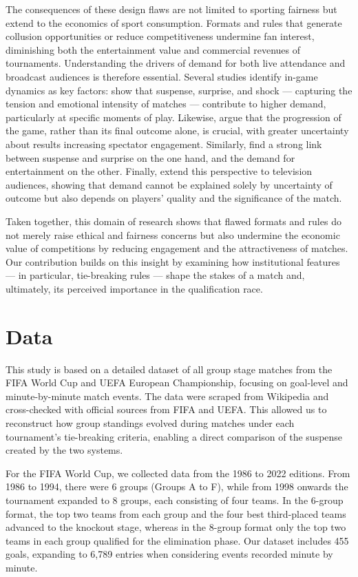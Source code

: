 \documentclass[11pt]{article}
\begin{document}
The consequences of these design flaws are not limited to sporting fairness but extend to the economics of sport consumption. Formats and rules that generate collusion opportunities or reduce competitiveness undermine fan interest, diminishing both the entertainment value and commercial revenues of tournaments. Understanding the drivers of demand for both live attendance and broadcast audiences is therefore essential. Several studies identify in-game dynamics as key factors: \citet{buraimo2020unscripted} show that suspense, surprise, and shock — capturing the tension and emotional intensity of matches — contribute to higher demand, particularly at specific moments of play. Likewise, \citet{alavy2010edge} argue that the progression of the game, rather than its final outcome alone, is crucial, with greater uncertainty about results increasing spectator engagement. Similarly, \citet{bizzozero2016importance} find a strong link between suspense and surprise on the one hand, and the demand for entertainment on the other. Finally, \citet{buraimo2022armchair} extend this perspective to television audiences, showing that demand cannot be explained solely by uncertainty of outcome but also depends on players' quality and the significance of the match.

Taken together, this domain of research shows that flawed formats and rules do not merely raise ethical and fairness concerns but also undermine the economic value of competitions by reducing engagement and the attractiveness of matches. Our contribution builds on this insight by examining how institutional features — in particular, tie-breaking rules — shape the stakes of a match and, ultimately, its perceived importance in the qualification race.


\section{Data}
\label{sec:data}

This study is based on a detailed dataset of all group stage matches from the FIFA World Cup and UEFA European Championship, focusing on goal-level and minute-by-minute match events. The data were scraped from Wikipedia and cross-checked with official sources from FIFA and UEFA. This allowed us to reconstruct how group standings evolved during matches under each tournament's tie-breaking criteria, enabling a direct comparison of the suspense created by the two systems.

For the FIFA World Cup, we collected data from the 1986 to 2022 editions. From 1986 to 1994, there were 6 groups (Groups A to F), while from 1998 onwards the tournament expanded to 8 groups, each consisting of four teams. In the 6-group format, the top two teams from each group and the four best third-placed teams advanced to the knockout stage, whereas in the 8-group format only the top two teams in each group qualified for the elimination phase. Our dataset includes 455 goals, expanding to 6,789 entries when considering events recorded minute by minute.
\end{document}
